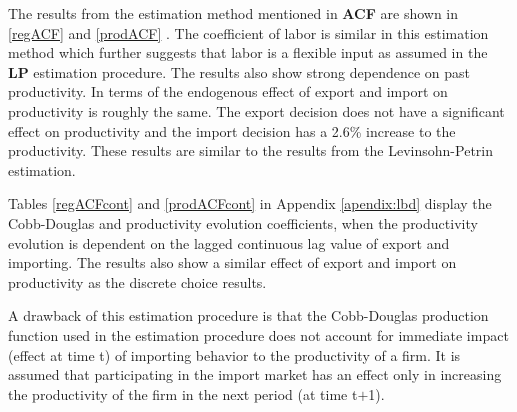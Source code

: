 \documentclass[12pt]{article}
\begin{document}
The results from the estimation method mentioned in
\textcite{ackerberg2006structural} \textbf{ACF} are shown in \ref{regACF} and \ref{prodACF}
. The coefficient of labor is similar in this
estimation method which further suggests that labor is a flexible
input as assumed in the \textbf{LP} estimation procedure. The results also
show strong dependence on past productivity. In terms of the endogenous effect
of export and import on productivity is roughly the same. The export
decision does not have a significant effect on productivity and the
import decision has a 2.6\% increase to the productivity. These
results are similar to the results from the Levinsohn-Petrin
estimation.   %
 
 




Tables \ref{regACFcont} and \ref{prodACFcont} in Appendix \ref{apendix:lbd}  display the Cobb-Douglas and
productivity evolution
coefficients,  when the
productivity evolution is dependent on the lagged continuous lag value of
export and importing. The results also show a similar effect of export
and import on productivity as the discrete choice results.  

A drawback of this estimation procedure is that 
the Cobb-Douglas production function used in the estimation procedure  does not
account for immediate impact (effect at time t) of 
importing behavior to the productivity of a firm.  It is assumed that
participating in the import market has an effect only in increasing the
productivity of the firm in the next period (at time t$+$1). 

\end{document}
